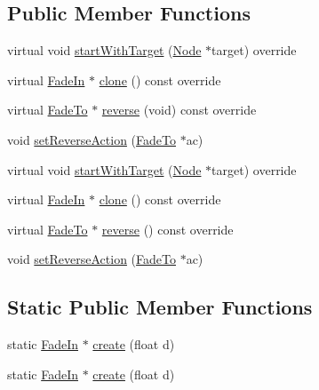 \subsection*{Public Member Functions}
\begin{DoxyCompactItemize}
\item 
virtual void \hyperlink{classFadeIn_a3a1c5c7aa1b80845aceeeb06ed059fad}{start\+With\+Target} (\hyperlink{classNode}{Node} $\ast$target) override
\item 
virtual \hyperlink{classFadeIn}{Fade\+In} $\ast$ \hyperlink{classFadeIn_ab6e6999c3e68cc9157acabd0a7db06d5}{clone} () const override
\item 
virtual \hyperlink{classFadeTo}{Fade\+To} $\ast$ \hyperlink{classFadeIn_a3c6c2fb763c9c394d37d2d699c482c3a}{reverse} (void) const override
\item 
void \hyperlink{classFadeIn_a50459f860444924936199c40eb48d02a}{set\+Reverse\+Action} (\hyperlink{classFadeTo}{Fade\+To} $\ast$ac)
\item 
virtual void \hyperlink{classFadeIn_ad97831da7a732a749d87634343e1711d}{start\+With\+Target} (\hyperlink{classNode}{Node} $\ast$target) override
\item 
virtual \hyperlink{classFadeIn}{Fade\+In} $\ast$ \hyperlink{classFadeIn_a11f3037a54e9cb96655fe74f5f007c06}{clone} () const override
\item 
virtual \hyperlink{classFadeTo}{Fade\+To} $\ast$ \hyperlink{classFadeIn_a434301deede4fbe06674250b5d7809be}{reverse} () const override
\item 
void \hyperlink{classFadeIn_a50459f860444924936199c40eb48d02a}{set\+Reverse\+Action} (\hyperlink{classFadeTo}{Fade\+To} $\ast$ac)
\end{DoxyCompactItemize}
\subsection*{Static Public Member Functions}
\begin{DoxyCompactItemize}
\item 
static \hyperlink{classFadeIn}{Fade\+In} $\ast$ \hyperlink{classFadeIn_a862eb13ebfe15dd806d03bd2f945be83}{create} (float d)
\item 
static \hyperlink{classFadeIn}{Fade\+In} $\ast$ \hyperlink{classFadeIn_a1e154829fd7e5a1b3b328c9545ef6955}{create} (float d)
\end{DoxyCompactItemize}
